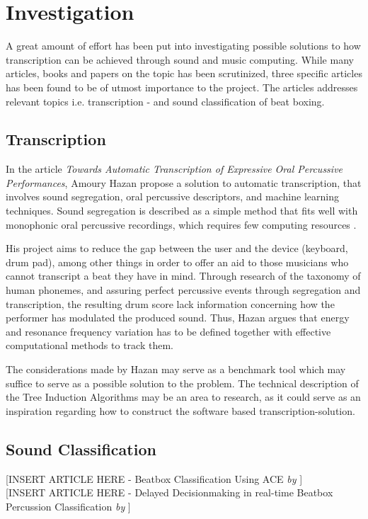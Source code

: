 \section{Investigation}
A great amount of effort has been put into investigating possible solutions to how transcription can be achieved through sound and music computing. While many articles, books and papers on the topic has been scrutinized, three specific articles has been found to be of utmost importance to the project. The articles addresses relevant topics i.e. transcription - and sound classification of beat boxing.

\subsection{Transcription}
In the article \textit{Towards Automatic Transcription of Expressive Oral Percussive Performances}, Amoury Hazan propose a solution to automatic transcription, that involves sound segregation, oral percussive descriptors, and machine learning techniques. Sound segregation is described as a simple method that fits well with monophonic oral percussive recordings, which requires few computing resources \citep{Hazan2005a}.	

His project aims to reduce the gap between the user and the device (keyboard, drum pad), among other things in order to offer an aid to those musicians who cannot transcript a beat they have in mind.
Through research of the taxonomy of human phonemes, and assuring perfect percussive events through segregation and transcription, the resulting drum score lack information concerning how the performer has modulated the produced sound. Thus, Hazan argues that energy and resonance frequency variation has to be defined together with effective computational methods to track them.
	
The considerations made by Hazan may serve as a benchmark tool which may suffice to serve as a possible solution to the problem. The technical description of the Tree Induction Algorithms may be an area to research, as it could serve as an inspiration regarding how to construct the software based transcription-solution.

\subsection{Sound Classification}

[INSERT ARTICLE HERE - Beatbox Classification Using ACE \textit{by} \citep{Sinyor05} ]
\\

[INSERT ARTICLE HERE - Delayed Decisionmaking in real-time Beatbox Percussion Classification \textit{by} \citep{Stowell2010} ]
